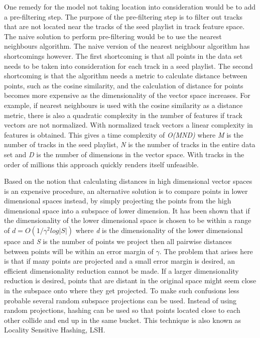 \documentclass[a4paper,11pt]{kth-mag}
\begin{document}
 One remedy for the model not taking location into consideration would be to add a pre-filtering step. The purpose of the pre-filtering step is to filter out tracks that are not located near the tracks of the seed playlist in track feature space. The naive solution to perform pre-filtering would be to use the nearest neighbours algorithm\cite{fix1951discriminatory}. The naive version of the nearest neighbour algorithm has shortcomings however. The first shortcoming is that all points in the data set needs to be taken into consideration for each track in a seed playlist. The second shortcoming is that the algorithm needs a metric to calculate distance between points, such as the cosine similarity, and the calculation of distance for points becomes more expensive as the dimensionality of the vector space increases. For example, if nearest neighbours is used with the cosine similarity as a distance metric, there is also a quadratic complexity in the number of features if track vectors are not normalized. With normalized track vectors a linear complexity in features is obtained. This gives a time complexity of \textit{O(MND)} where \textit{M} is the number of tracks in the seed playlist, \textit{N} is the number of tracks in the entire data set and \textit{D} is the number of dimensions in the vector space. With tracks in the order of millions this approach quickly renders itself unfeasible. 
 
Based on the notion that calculating distances in high dimensional vector spaces is an expensive procedure, an alternative solution is to compare points in lower dimensional spaces instead, by simply projecting the points from the high dimensional space into a subspace of lower dimension. It has been shown that if the dimensionality of the lower dimensional space is chosen to be within a range of $d = O(1/\gamma^2 log |S|)$ where \textit{d} is the dimensionality of the lower dimensional space and \textit{S} is the number of points we project then all pairwise distances between points will be within an error margin of $\gamma$\cite{blum2006random}. The problem that arises here is that if many points are projected and a small error margin is desired, an efficient dimensionality reduction cannot be made. If a larger dimensionality reduction is desired, points that are distant in the original space might seem close in the subspace onto where they get projected. To make such confusions less probable several random subspace projections can be used. Instead of using random projections, hashing can be used so that points located close to each other collide and end up in the same bucket.
This technique is also known as Locality Sensitive Hashing, LSH\cite{andoni2006near}.
\end{document}
